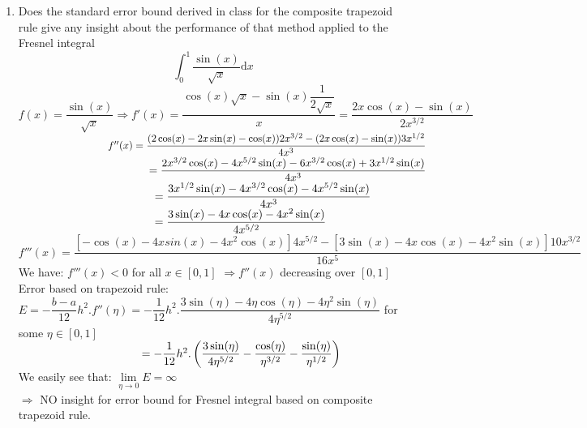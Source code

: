 \documentclass[14pt,a4paper]{article}
\begin{document}
\begin{enumerate}
	\label{1a}
	\item Does the standard error bound derived in class for the composite trapezoid rule give any insight about the performance of that method applied to the Fresnel integral
	$$ \int_{0}^{1}\dfrac{\sin(x)}{\sqrt{x}}\mathrm{d}x$$ 
	$f(x) = \dfrac{\sin(x)}{\sqrt{x}} \Rightarrow f'(x) = \dfrac{\cos(x)\sqrt{x} - \sin(x)\dfrac{1}{2\sqrt{x}}}{x} = \dfrac{2x\cos(x) - \sin(x)}{2x^{3/2}} $\\
	$ \hspace*{3.1cm} f''(x) = \dfrac{(2\cos(x) - 2x\sin(x) - \cos(x))2x^{3/2} - (2x\cos(x) - \sin(x))3x^{1/2}}{4x^3}$\\
	$ \hspace*{4.2cm} = \dfrac{2x^{3/2}\cos(x) - 4x^{5/2}\sin(x) - 6x^{3/2}\cos(x) + 3x^{1/2}\sin(x)}{4x^3}$\\
	$ \hspace*{4.2cm} = \dfrac{3x^{1/2}\sin(x) - 4x^{3/2}\cos(x) - 4x^{5/2}\sin(x)}{4x^3}$\\
	$ \hspace*{4.2cm} = \dfrac{3\sin(x) - 4x\cos(x) - 4x^2\sin(x)}{4x^{5/2}}$\\
		$f'''(x) =   \dfrac{\left[- \cos(x) - 4xsin(x) - 4x^2\cos(x)\right]4x^{5/2} - \left[3\sin(x) - 4x\cos(x) - 4x^2\sin(x)\right]10x^{3/2}}{16x^5}$
	We have: $f'''(x) < 0$ for all $x \in [0,1]$ $\Rightarrow f''(x)$ decreasing over $[0,1]$\\ 
	Error based on trapezoid rule:\\
	$E = -\dfrac{b-a}{12}h^2.f''(\eta) = -\dfrac{1}{12}h^2. \dfrac{3\sin(\eta) - 4\eta\cos(\eta) - 4\eta^2\sin(\eta)}{4\eta^{5/2}}$ \hspace{0.5cm} for some $\eta \in [0,1]$\\
	$ \hspace*{3.8cm} =-\dfrac{1}{12}h^2.\left( \dfrac{3\sin(\eta)}{4\eta^{5/2}} - \dfrac{\cos(\eta)}{\eta^{3/2}} - \dfrac{\sin(\eta)}{\eta^{1/2}}\right)$\\
	We easily see that: $\lim\limits_{\eta \rightarrow 0}E = \infty$\\
	$\Rightarrow$ NO insight for error bound for Fresnel integral based on composite trapezoid rule. 
	

\end{enumerate}
\end{document}

